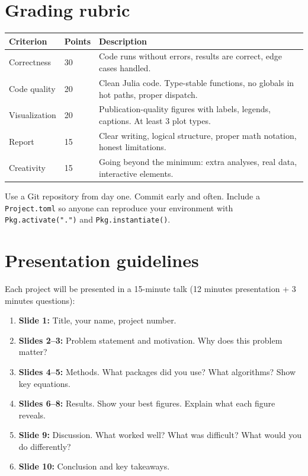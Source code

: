 \section{Grading rubric}

\begin{longtable}{p{4.5cm}p{1.5cm}p{7.5cm}}
\toprule
\textbf{Criterion} & \textbf{Points} & \textbf{Description} \\
\midrule
\endhead
Correctness & 30 & Code runs without errors, results are correct, edge cases handled. \\
\addlinespace
Code quality & 20 & Clean Julia code. Type-stable functions, no globals in hot paths, proper dispatch. \\
\addlinespace
Visualization & 20 & Publication-quality figures with labels, legends, captions. At least 3 plot types. \\
\addlinespace
Report & 15 & Clear writing, logical structure, proper math notation, honest limitations. \\
\addlinespace
Creativity & 15 & Going beyond the minimum: extra analyses, real data, interactive elements. \\
\bottomrule
\end{longtable}

\begin{performancetip}
Use a Git repository from day one. Commit early and often. Include a \texttt{Project.toml} so anyone can reproduce your environment with \texttt{Pkg.activate(".")} and \texttt{Pkg.instantiate()}.
\end{performancetip}

\section{Presentation guidelines}

Each project will be presented in a 15-minute talk (12 minutes presentation + 3 minutes questions):

\begin{enumerate}
  \item \textbf{Slide 1:} Title, your name, project number.
  \item \textbf{Slides 2--3:} Problem statement and motivation. Why does this problem matter?
  \item \textbf{Slides 4--5:} Methods. What packages did you use? What algorithms? Show key equations.
  \item \textbf{Slides 6--8:} Results. Show your best figures. Explain what each figure reveals.
  \item \textbf{Slide 9:} Discussion. What worked well? What was difficult? What would you do differently?
  \item \textbf{Slide 10:} Conclusion and key takeaways.
\end{enumerate}

